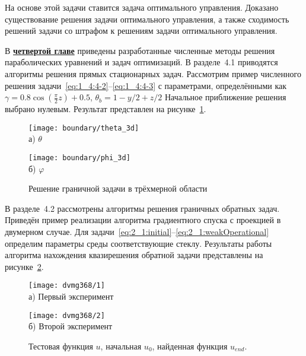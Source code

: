 На основе этой задачи ставится задача оптимального управления.
Доказано существование решения задачи оптимального управления, а также
сходимость решений задачи со штрафом к решениям задачи оптимального управления.


В \underline{\textbf{четвертой главе}} приведены разработанные численные методы решения
параболических уравнений и задач оптимизаций.
В разделе~4.1 приводятся алгоритмы решения прямых стационарных задач.
Рассмотрим пример численного решения задачи~\eqref{eq:1_4:4-2}--\eqref {eq:1_4:4-3}
с параметрами, определёнными как
$\gamma = 0.8 \cos\left(\frac{\pi}{2} z\right) + 0.5$,
$\theta_b = 1- y / 2 + z /2$
Начальное приближение решения выбрано нулевым.
Результат представлен на рисунке~\ref{fig:4_1:boundary_3d}.
\begin{figure}[h!t]
    \begin{minipage}[b][][b]{0.49\linewidth}
        \centering
        \texttt{[image: boundary/theta\_3d]} \\ а) $\theta$
    \end{minipage}
    \hfill
    \begin{minipage}[b][][b]{0.49\linewidth}
        \centering
        \texttt{[image: boundary/phi\_3d]} \\ б) $\varphi$
    \end{minipage}
    \caption{Решение граничной задачи в трёхмерной области}
    \label{fig:4_1:boundary_3d}
\end{figure}


В разделе~4.2 рассмотрены алгоритмы решения граничных обратных задач.
Приведён пример реализации алгоритма градиентного спуска с проекцией в двумерном случае.
Для задачи~\eqref{eq:2_1:initial}--\eqref{eq:2_1:weakOperational}
определим параметры среды соответствующие стеклу.
Результаты работы алгоритма нахождения квазирешения обратной задачи
представлены на рисунке~\ref{fig:4_3:control}.
\begin{figure}[h!t]
    \begin{minipage}[b][][b]{0.49\linewidth}
        \centering
        \texttt{[image: dvmg368/1]} \\ а) Первый эксперимент
    \end{minipage}
    \hfill
    \begin{minipage}[b][][b]{0.49\linewidth}
        \centering
        \texttt{[image: dvmg368/2]} \\ б) Второй эксперимент
    \end{minipage}
    \caption{Тестовая функция $u$, начальная $u_0$, найденная функция $u_{end}.$}
    \label{fig:4_3:control}
\end{figure}


